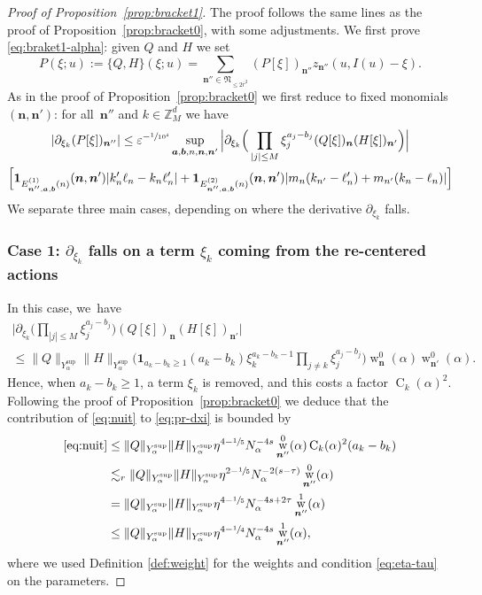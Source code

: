 \documentclass[10pt,a4paper]{amsart}
\DeclareMathOperator{\rw}{w}
\theoremstyle{plain}
\theoremstyle{definition}
\newcommand{\nb}{{\boldsymbol n}}
\newcommand{\Nb}{{\boldsymbol{\mathfrak{N}}}}
\newcommand{\Z}{\mathbb{Z}}
\newcommand{\1}{\mathbf{1}}
\newcommand{\Ysup}[1]{Y_{#1}^{\mathrm{sup}}}
\let\epsilon\varepsilon
\begin{document}
\begin{proof}[Proof of Proposition~\ref{prop:bracket1}] The proof follows the same lines as the proof of Proposition~\ref{prop:bracket0}, with some adjustments.
We first prove \eqref{eq:braket1-alpha}: given $Q$ and $ H$ we set
\[
P(\xi;u) := \{Q,H\}(\xi;u) = \sum_{\nb''\in\Nb_{\leq2\overline{r}^{2}}}(P[\xi])_{\nb''}z_{\nb''}(u,I(u)-\xi).
\]
As in the proof of Proposition~\ref{prop:bracket0} we first reduce to fixed monomials $(\nb,\nb')$: for all~$\nb''$ and $k\in\Z_{M}^{d}$ we have
\begin{multline}
|\partial_{\xi_{k}}(P[\xi])_{\nb''}|
\leq \epsilon^{-\sfrac{1}{10^{4}}}\sup_{\boldsymbol{a},\boldsymbol{b},n,\nb,\nb'}
\Big|
\partial_{\xi_{k}}
\Big(\prod_{|j|\leq M}\xi_{j}^{a_{j}-b_{j}}
(Q[\xi])_{\nb}(H[\xi])_{\nb'}
\Big)
\Big| \\
\Big[
\mathbf{1}_{E_{\nb'',\boldsymbol{a},\boldsymbol{b}}^{(1)}(n)}(\nb,\nb')|k_{n}'\ell_{n}-k_{n}\ell_{n}'|
+\mathbf{1}_{E_{\nb'',\boldsymbol{a},\boldsymbol{b}}^{(2)}(n)}(\nb,\nb')
|m_{n}(k_{n'}-\ell_{n}')+m_{n'}(k_{n}-\ell_{n})|
\Big]
\label{eq:pr-dxi}
\end{multline}
We separate three main cases, depending on where the derivative $\partial_{\xi_{k}}$ falls.

\subsubsection*{Case 1: $\partial_{\xi_{k}}$ falls on a term $\xi_{k}$ coming from the re-centered actions}
In this case, we~have
\begin{multline}
\Big|
\partial_{\xi_{k}}
\Big(
\prod_{|j|\leq M}\xi_{j}^{a_{j}-b_{j}}
\Big)
(Q[\xi])_{\nb}(H[\xi])_{\nb'}
\Big| \\
\leq
\|Q\|_{\Ysup{\alpha}}\|H\|_{\Ysup{\alpha}}
\Big(
\mathbf{1}_{a_{k}-b_{k}\geq1}(a_{k}-b_{k})\xi_{k}^{a_{k}-b_{k}-1}
\prod_{j\neq k}\xi_{j}^{a_{j}-b_{j}}\Big)
\rw_{\nb}^{0}(\alpha)
\rw_{\nb'}^{0}(\alpha).
\label{eq:nuit}
\end{multline}
Hence, when $a_{k}-b_{k}\geq1$, a term $\xi_{k}$ is removed, and this costs a factor $\operatorname{C}_{k}(\alpha)^{2}$. Following the proof of Proposition~\ref{prop:bracket0} we deduce that the contribution of \eqref{eq:nuit} to \eqref{eq:pr-dxi} is bounded by
\begin{align*}
\eqref{eq:nuit}
&\leq
\|Q\|_{\Ysup{\alpha}}\|H\|_{\Ysup{\alpha}}
\eta^{4-\sfrac{1}{5}}N_{\alpha}^{-4s}
\rw_{\nb''}^{0}(\alpha)
\operatorname{C}_{k}(\alpha)^{2}
(a_{k}-b_{k})
\\
&\lesssim_{r}
\|Q\|_{\Ysup{\alpha}}\|H\|_{\Ysup{\alpha}}
\eta^{2-\sfrac{1}{5}}N_{\alpha}^{-2(s-\tau)}
\rw_{\nb''}^{0}(\alpha)
\\
&=
\|Q\|_{\Ysup{\alpha}}\|H\|_{\Ysup{\alpha}}
\eta^{4-\sfrac{1}{5}}N_{\alpha}^{-4s+2\tau}
\rw_{\nb''}^{1}(\alpha)
\\
&\leq
\|Q\|_{\Ysup{\alpha}}\|H\|_{\Ysup{\alpha}}
\eta^{4-\sfrac{1}{4}}N_{\alpha}^{-4s}\rw_{\nb''}^{1}(\alpha),
\end{align*}
where we used Definition \ref{def:weight} for the weights and condition \eqref{eq:eta-tau} on the parameters.


\end{proof}
\end{document}
